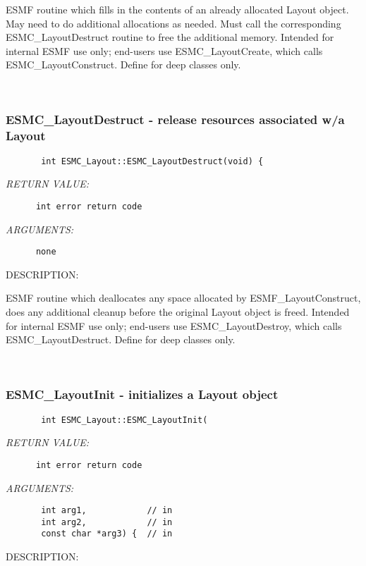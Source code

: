         ESMF routine which fills in the contents of an already
        allocated Layout object.  May need to do additional allocations
        as needed.  Must call the corresponding ESMC\_LayoutDestruct
        routine to free the additional memory.  Intended for internal
        ESMF use only; end-users use ESMC\_LayoutCreate, which calls
        ESMC\_LayoutConstruct.  Define for deep classes only.
   
 
\mbox{}\hrulefill\ 
 
\subsubsection{ESMC\_LayoutDestruct - release resources associated w/a Layout}


  
\begin{verbatim}       int ESMC_Layout::ESMC_LayoutDestruct(void) {\end{verbatim}{\em RETURN VALUE:}
\begin{verbatim}      int error return code\end{verbatim}{\em ARGUMENTS:}
\begin{verbatim}      none\end{verbatim}
{\sf DESCRIPTION:\\ }


        ESMF routine which deallocates any space allocated by
        ESMF\_LayoutConstruct, does any additional cleanup before the
        original Layout object is freed.  Intended for internal ESMF
        use only; end-users use ESMC\_LayoutDestroy, which calls
        ESMC\_LayoutDestruct.  Define for deep classes only.
   
 
\mbox{}\hrulefill\ 
 
\subsubsection{ESMC\_LayoutInit - initializes a Layout object}


  
\begin{verbatim}       int ESMC_Layout::ESMC_LayoutInit(\end{verbatim}{\em RETURN VALUE:}
\begin{verbatim}      int error return code\end{verbatim}{\em ARGUMENTS:}
\begin{verbatim}       int arg1,            // in
       int arg2,            // in
       const char *arg3) {  // in\end{verbatim}
{\sf DESCRIPTION:\\ }


